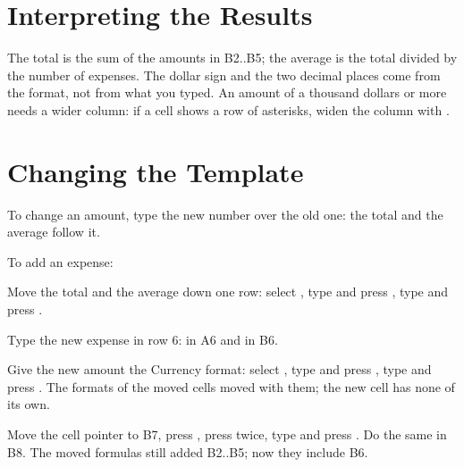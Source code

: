 \section{Interpreting the Results}
The total is the sum of the amounts in B2..B5; the average is the total
divided by the number of expenses.  The dollar sign and the two decimal
places come from the format, not from what you typed.  An amount of a
thousand dollars or more needs a wider column: if a cell shows a row of
asterisks, widen the column with .

\section{Changing the Template}
To change an amount, type the new number over the old one: the total and
the average follow it.

To add an expense:
\begin{Steps123}
\item Move the total and the average down one row: select
  , type  and press , type
   and press .
\item Type the new expense in row 6:  in A6 and  in
  B6.
\item Give the new amount the Currency format: select
  , type  and press ,
  type  and press .  The formats of the moved cells
  moved with them; the new cell has none of its own.
\item Move the cell pointer to B7, press , press
   twice, type  and press .  Do the
  same in B8.  The moved formulas still added B2..B5; now they include
  B6.
\end{Steps123}
